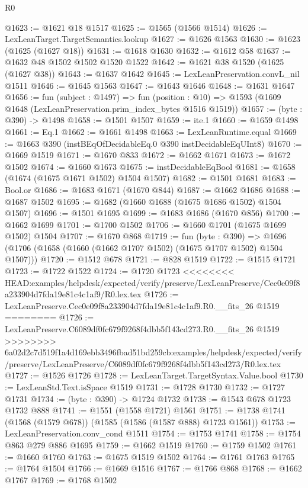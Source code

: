\begin{lexlean}{R0}
\begin{coremodule}
{{{{{{{{{{{{{{{{{{{{{{{{{{{{{{{{{{{{{{{{{{{{{{{{{{{{{{{{{{{{{{{{{{{{{{{{{@1623 := @1621 @18 @1517
@1625 := @1565 (@1566 @1514)
@1626 := LexLeanTarget.TargetSemantics.lookup
@1627 := @1626 @1563
@1630 := @1623 (@1625 (@1627 @18))
@1631 := @1618 @1630
@1632 := @1612 @58
@1637 := @1632 @48 @1502 @1502 @1520 @1522
@1642 := @1621 @38 @1520 (@1625 (@1627 @38))
@1643 := @1637 @1642
@1645 := LexLeanPreservation.convL_nil @1511
@1646 := @1645 @1563
@1647 := @1643 @1646
@1648 := @1631 @1647
@1656 := fun (subject : @1497) =>
  fun (position : @10) => @1593 (@1609 @1648 (LexLeanPreservation.prim_index_bytes @1516 @1519))
@1657 := (byte : @390) -> @1498
@1658 := @1501 @1507
@1659 := ite.{1}
@1660 := @1659 @1498
@1661 := Eq.{1}
@1662 := @1661 @1498
@1663 := LexLeanRuntime.equal
@1669 := @1663 @390 (instBEqOfDecidableEq.{0} @390 instDecidableEqUInt8)
@1670 := @1669 @1519
@1671 := @1670 @833
@1672 := @1662 @1671
@1673 := @1672 @1502
@1674 := @1660 @1673
@1675 := instDecidableEqBool
@1681 := @1658 (@1674 (@1675 @1671 @1502) @1504 @1507)
@1682 := @1501 @1681
@1683 := Bool.or
@1686 := @1683 @1671 (@1670 @844)
@1687 := @1662 @1686
@1688 := @1687 @1502
@1695 := @1682 (@1660 @1688 (@1675 @1686 @1502) @1504 @1507)
@1696 := @1501 @1695
@1699 := @1683 @1686 (@1670 @856)
@1700 := @1662 @1699
@1701 := @1700 @1502
@1706 := @1660 @1701 (@1675 @1699 @1502) @1504
@1707 := @1670 @868
@1719 := fun (byte : @390) =>
  @1696 (@1706 (@1658 (@1660 (@1662 @1707 @1502) (@1675 @1707 @1502) @1504 @1507)))
@1720 := @1512 @678
@1721 := @828 @1519
@1722 := @1515 @1721
@1723 := @1722 @1522
@1724 := @1720 @1723
<<<<<<<< HEAD:examples/helpdesk/expected/verify/preserve/LexLeanPreserve/Cec0e09f8a233904d7fda19e81c4c1af9/R0.lex.tex
@1726 := LexLeanPreserve.Cec0e09f8a233904d7fda19e81c4c1af9.R0.__fits_26 @1519
========
@1726 := LexLeanPreserve.C6089df0fc679f9268f4dbb5f143cd273.R0.__fits_26 @1519
>>>>>>>> 6a02d2c7d519f1a4d169ebb3496fbad51bd259cb:examples/helpdesk/expected/verify/preserve/LexLeanPreserve/C6089df0fc679f9268f4dbb5f143cd273/R0.lex.tex
@1727 := @1526 @1726
@1728 := LexLeanTarget.TargetSyntax.Value.bool
@1730 := LexLeanStd.Text.isSpace @1519
@1731 := @1728 @1730
@1732 := @1727 @1731
@1734 := (byte : @390) -> @1724 @1732
@1738 := @1543 @678 @1723 @1732 @888
@1741 := @1551 (@1558 @1721) @1561
@1751 := @1738 @1741 (@1568 (@1579 @678)) (@1585 (@1586 (@1587 @888) @1723 @1561))
@1753 := LexLeanPreservation.conv_cond @1511
@1754 := @1753 @1741
@1758 := @1754 @863 @279 @886 @1695
@1759 := @1662 @1519
@1760 := @1759 @1502
@1761 := @1660 @1760
@1763 := @1675 @1519 @1502
@1764 := @1761 @1763
@1765 := @1764 @1504
@1766 := @1669 @1516
@1767 := @1766 @868
@1768 := @1662 @1767
@1769 := @1768 @1502
}}}}}}}}}}}}}}}}}}}}}}}}}}}}}}}}}}}}}}}}}}}}}}}}}}}}}}}}}}}}}}}}}}}}}}}}}
\end{coremodule}
\end{lexlean}
